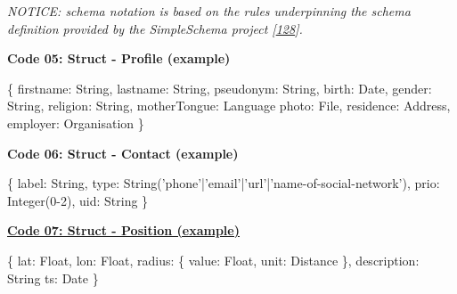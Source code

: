 \documentclass[12pt,english,a4paper,titlepage,cleardoublepage=empty,dottedtoc]{report}
\newenvironment{Shaded}{}{}
\newcommand{\DataTypeTok}[1]{\textcolor[rgb]{0.56,0.13,0.00}{{#1}}}
\newcommand{\DecValTok}[1]{\textcolor[rgb]{0.25,0.63,0.44}{{#1}}}
\newcommand{\StringTok}[1]{\textcolor[rgb]{0.25,0.44,0.63}{{#1}}}
\newcommand{\OperatorTok}[1]{\textcolor[rgb]{0.40,0.40,0.40}{{#1}}}
\newcommand{\AttributeTok}[1]{\textcolor[rgb]{0.49,0.56,0.16}{{#1}}}
\newcommand{\NormalTok}[1]{{#1}}
\begin{document}
\emph{NOTICE: schema notation is based on the rules underpinning the
schema definition provided by the SimpleSchema project
{[}\protect\hyperlink{ref-web_2017_repo_node-simple-schema}{128}{]}.}

\textbf{\protect\hypertarget{code-05_struct_profile}{}{Code 05: Struct -
Profile (example)}}

\begin{Shaded}
\begin{Highlighting}[]
\OperatorTok{\{}
    \DataTypeTok{firstname}\OperatorTok{:} \NormalTok{String}\OperatorTok{,}
    \DataTypeTok{lastname}\OperatorTok{:} \NormalTok{String}\OperatorTok{,}
    \DataTypeTok{pseudonym}\OperatorTok{:} \NormalTok{String}\OperatorTok{,}
    \DataTypeTok{birth}\OperatorTok{:} \NormalTok{Date}\OperatorTok{,}
    \DataTypeTok{gender}\OperatorTok{:} \NormalTok{String}\OperatorTok{,}
    \DataTypeTok{religion}\OperatorTok{:} \NormalTok{String}\OperatorTok{,}
    \DataTypeTok{motherTongue}\OperatorTok{:} \NormalTok{Language}
    \DataTypeTok{photo}\OperatorTok{:} \NormalTok{File}\OperatorTok{,}
    \DataTypeTok{residence}\OperatorTok{:} \NormalTok{Address}\OperatorTok{,}
    \DataTypeTok{employer}\OperatorTok{:} \NormalTok{Organisation}
\OperatorTok{\}}
\end{Highlighting}
\end{Shaded}

\textbf{\protect\hypertarget{code-06_struct_contact}{}{Code 06: Struct -
Contact (example)}}

\begin{Shaded}
\begin{Highlighting}[]
\OperatorTok{\{}
    \DataTypeTok{label}\OperatorTok{:} \NormalTok{String}\OperatorTok{,}
    \DataTypeTok{type}\OperatorTok{:} \AttributeTok{String}\NormalTok{(}\StringTok{'phone'}\OperatorTok{|}\StringTok{'email'}\OperatorTok{|}\StringTok{'url'}\OperatorTok{|}\StringTok{'name-of-social-network'}\NormalTok{)}\OperatorTok{,}
    \DataTypeTok{prio}\OperatorTok{:} \AttributeTok{Integer}\NormalTok{(}\DecValTok{0-2}\NormalTok{)}\OperatorTok{,}
    \DataTypeTok{uid}\OperatorTok{:} \NormalTok{String}
\OperatorTok{\}}
\end{Highlighting}
\end{Shaded}

\textbf{\protect\hyperlink{code-07_struct_position}{Code 07: Struct -
Position (example)}}

\begin{Shaded}
\begin{Highlighting}[]
\OperatorTok{\{}
    \DataTypeTok{lat}\OperatorTok{:} \NormalTok{Float}\OperatorTok{,}
    \DataTypeTok{lon}\OperatorTok{:} \NormalTok{Float}\OperatorTok{,}
    \DataTypeTok{radius}\OperatorTok{:} \OperatorTok{\{}
        \DataTypeTok{value}\OperatorTok{:} \NormalTok{Float}\OperatorTok{,}
        \DataTypeTok{unit}\OperatorTok{:} \NormalTok{Distance}
    \OperatorTok{\},}
    \DataTypeTok{description}\OperatorTok{:} \NormalTok{String}
    \DataTypeTok{ts}\OperatorTok{:} \NormalTok{Date}
\OperatorTok{\}}
\end{Highlighting}
\end{Shaded}
\end{document}
